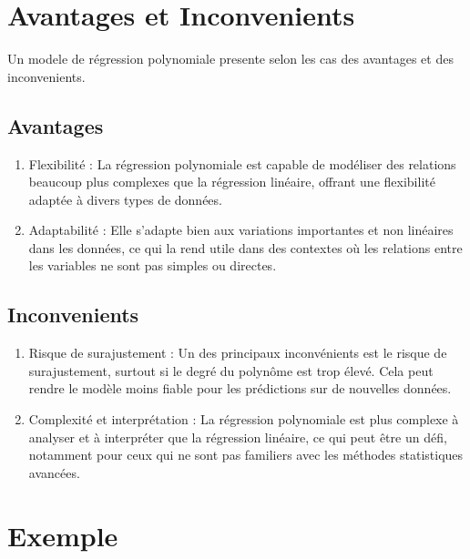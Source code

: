 \documentclass[a0,portrait]{a0poster}
\begin{document}
\section*{Avantages et Inconvenients}

Un modele de régression polynomiale presente selon les cas des avantages et des inconvenients.

\subsection*{Avantages}

\begin{enumerate}
    \item Flexibilité : La régression polynomiale est capable de modéliser des relations beaucoup plus complexes que la régression linéaire, offrant une flexibilité adaptée à divers types de données.
    \item Adaptabilité : Elle s'adapte bien aux variations importantes et non linéaires dans les données, ce qui la rend utile dans des contextes où les relations entre les variables ne sont pas simples ou directes.
\end{enumerate}

\subsection*{Inconvenients}

\begin{enumerate}
    \item Risque de surajustement : Un des principaux inconvénients est le risque de surajustement, surtout si le degré du polynôme est trop élevé. Cela peut rendre le modèle moins fiable pour les prédictions sur de nouvelles données.
    \item Complexité et interprétation : La régression polynomiale est plus complexe à analyser et à interpréter que la régression linéaire, ce qui peut être un défi, notamment pour ceux qui ne sont pas familiers avec les méthodes statistiques avancées.
\end{enumerate}


\section*{Exemple}
\end{document}
